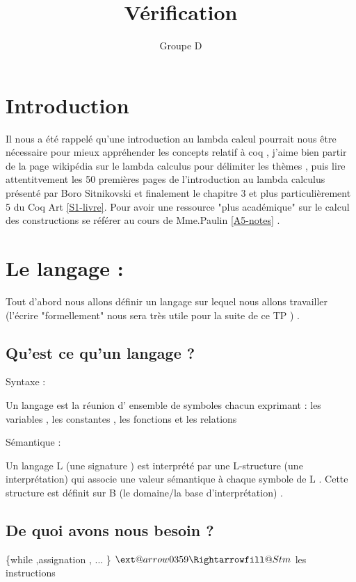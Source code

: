 \documentclass{article}
\makeatletter
\newcommand{\xRightarrow}[2][]{\ext@arrow 0359\Rightarrowfill@{#1}{#2}}
\makeatother
\begin{document}
\title{Vérification}
\author{Groupe D}

\maketitle



\section{Introduction}
Il nous a été rappelé qu'une introduction au lambda calcul pourrait nous être nécessaire pour mieux appréhender les concepts relatif à coq , j'aime bien  partir de la page wikipédia sur le lambda calculus \cite{FT21} pour délimiter les thèmes , puis lire attentitvement les 50 premières pages de l'introduction au lambda calculus présenté par Boro Sitnikovski \cite{A4-book} et finalement le  chapitre 3 et plus particulièrement 5 du  Coq Art \ref{S1-livre}. 
Pour avoir une ressource "plus académique" sur le calcul des constructions se référer au cours de Mme.Paulin \ref{A5-notes} . 

\pagebreak
\section{ Le langage :}
Tout d'abord nous allons définir un langage sur lequel nous allons travailler (l'écrire "formellement" nous sera très utile pour la suite de ce TP ) .
\subsection{Qu'est ce qu'un langage ?}

Syntaxe :

Un langage est la réunion d' ensemble de symboles chacun exprimant : 
les variables , les constantes , les fonctions et les relations  

\medskip 

\noindent Sémantique :

Un langage L (une signature ) est interprété par une L-structure (une interprétation)  qui  associe une valeur sémantique à chaque symbole de L . Cette structure est définit sur B (le domaine/la base  d'interprétation) .

\subsection{De quoi avons nous besoin ?}

\{while ,assignation , ... \}  $\xRightarrow{Stm}$ les instructions
\end{document}
